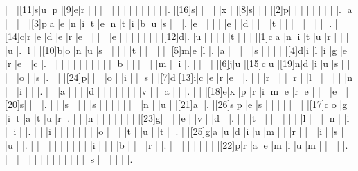 \documentclass[12pt]{article}
\begin{document}
\begin{Puzzle}{22}{24}
  |{}  |{}  |[11]s|u   |p   |[9]e|r   |{}  |{}  |{}  |{}  |{}  |{}  |{}  |{}  |{}  |{}  |{}  |{}  |{}  |.
  |[16]s|{}  |{}  |{}  |{}  |x   |{}  |[8]s|{}  |{}  |{}  |[2]p|{}  |{}  |{}  |{}  |{}  |{}  |{}  |{}  |.
  |a   |{}  |{}  |{}  |{}  |[3]p|a   |e   |n   |i   |t   |e   |n   |t   |i   |b   |u   |s   |{}  |{}  |.
  |e   |{}  |{}  |{}  |{}  |e   |{}  |d   |{}  |{}  |{}  |t   |{}  |{}  |{}  |{}  |{}  |{}  |{}  |{}  |.
  |[14]c|r   |e   |d   |e   |r   |e   |{}  |{}  |{}  |{}  |e   |{}  |{}  |{}  |{}  |{}  |{}  |{}  |[12]d|.
  |u   |{}  |{}  |{}  |{}  |t   |{}  |{}  |{}  |[1]c|a   |n   |i   |t   |u   |r   |{}  |{}  |{}  |u   |.
  |l   |{}  |[10]b|o   |n   |u   |s   |{}  |{}  |{}  |{}  |t   |{}  |{}  |{}  |{}  |{}  |[5]m|e   |l   |.
  |a   |{}  |{}  |{}  |{}  |s   |{}  |{}  |{}  |{}  |[4]d|i   |l   |i   |g   |e   |r   |e   |{}  |c   |.
  |{}  |{}  |{}  |{}  |{}  |{}  |{}  |{}  |{}  |{}  |{}  |b   |{}  |{}  |{}  |{}  |{}  |m   |{}  |i   |.
  |{}  |{}  |{}  |{}  |[6]j|u   |[15]c|u   |[19]n|d   |i   |u   |s   |{}  |{}  |{}  |{}  |o   |{}  |s   |.
  |{}  |{}  |[24]p|{}  |{}  |{}  |o   |{}  |i   |{}  |{}  |s   |{}  |[7]d|[13]i|c   |e   |r   |e   |{}  |.
  |{}  |{}  |r   |{}  |{}  |{}  |r   |{}  |l   |{}  |{}  |{}  |{}  |{}  |n   |{}  |{}  |i   |{}  |{}  |.
  |{}  |{}  |a   |{}  |{}  |{}  |d   |{}  |{}  |{}  |{}  |{}  |{}  |{}  |v   |{}  |{}  |a   |{}  |{}  |.
  |{}  |{}  |[18]e|x   |p   |r   |i   |m   |e   |r   |e   |{}  |{}  |{}  |e   |{}  |[20]s|{}  |{}  |{}  |.
  |{}  |{}  |s   |{}  |{}  |{}  |s   |{}  |{}  |{}  |{}  |{}  |{}  |{}  |n   |{}  |u   |{}  |[21]a|{}  |.
  |[26]s|p   |e   |s   |{}  |{}  |{}  |{}  |{}  |{}  |{}  |[17]c|o   |g   |i   |t   |a   |t   |u   |r   |.
  |{}  |{}  |n   |{}  |{}  |{}  |{}  |{}  |{}  |{}  |[23]g|{}  |{}  |{}  |e   |{}  |v   |{}  |d   |{}  |.
  |{}  |{}  |t   |{}  |{}  |{}  |{}  |{}  |{}  |{}  |l   |{}  |{}  |{}  |n   |{}  |i   |{}  |i   |{}  |.
  |{}  |{}  |i   |{}  |{}  |{}  |{}  |{}  |{}  |{}  |o   |{}  |{}  |{}  |t   |{}  |u   |{}  |t   |{}  |.
  |{}  |[25]g|a   |u   |d   |i   |u   |m   |{}  |{}  |r   |{}  |{}  |{}  |i   |{}  |s   |{}  |u   |{}  |.
  |{}  |{}  |{}  |{}  |{}  |{}  |{}  |{}  |{}  |{}  |i   |{}  |{}  |{}  |b   |{}  |{}  |{}  |r   |{}  |.
  |{}  |{}  |{}  |{}  |{}  |{}  |{}  |{}  |[22]p|r   |a   |e   |m   |i   |u   |m   |{}  |{}  |{}  |{}  |.
  |{}  |{}  |{}  |{}  |{}  |{}  |{}  |{}  |{}  |{}  |{}  |{}  |{}  |{}  |s   |{}  |{}  |{}  |{}  |{}  |.
\end{Puzzle}
\end{document}

